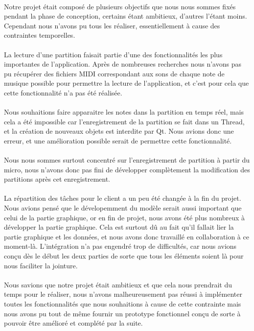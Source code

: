 \paragraph{}
Notre projet était composé de plusieurs objectifs que nous nous sommes fixés pendant la phase de conception, certains étant ambitieux, d'autres l'étant moins. Cependant nous n'avons pu tous les réaliser, essentiellement à cause des contraintes temporelles.

\paragraph{}
La lecture d'une partition faisait partie d'une des fonctionnalités les plus importantes de l'application. Après 
de nombreuses recherches nous n'avons pas pu récupérer des fichiers MIDI correspondant aux sons de chaque 
note de musique possible pour permettre la lecture de l'application, et c'est pour cela que cette fonctionnalité 
n'a pas été réalisée.

\paragraph{}
Nous souhaitions faire apparaitre les notes dans la partition en temps réel, mais cela a été impossible car l'enregistrement de la partition se fait dans un Thread, et la création de nouveaux objets est 
interdite par Qt. Nous avions donc une erreur, et une amélioration possible serait de permettre cette fonctionnalité.

\paragraph{}
Nous nous sommes surtout concentré sur l'enregistrement de partition à partir du micro, nous n'avons donc pas fini 
de développer complètement la modification des partitions après cet enregistrement.

\paragraph{}
La répartition des tâches pour le client a un peu été changée à la fin du projet. Nous avions pensé que le dévelopemment 
du modèle serait aussi important que celui de la partie graphique, or en fin de projet, nous avons été plus nombreux à 
développer la partie graphique. Cela est surtout dû au fait qu'il fallait lier la partie graphique et les données, 
et nous avons donc travaillé en collaboration à ce moment-là. L'intégration n'a pas engendré trop de difficultés, car 
nous avions conçu dès le début les deux parties de sorte que tous les éléments soient là pour nous faciliter la jointure. 

\paragraph{}
Nous savions que notre projet était ambitieux et que cela nous prendrait du temps pour le réaliser, nous n'avons malheureusement 
pas réussi à implémenter toutes les fonctionnalités que nous souhaitions à cause de cette contrainte mais nous avons pu 
tout de même fournir un prototype fonctionnel conçu de sorte à pouvoir être amélioré et complété par la suite.
